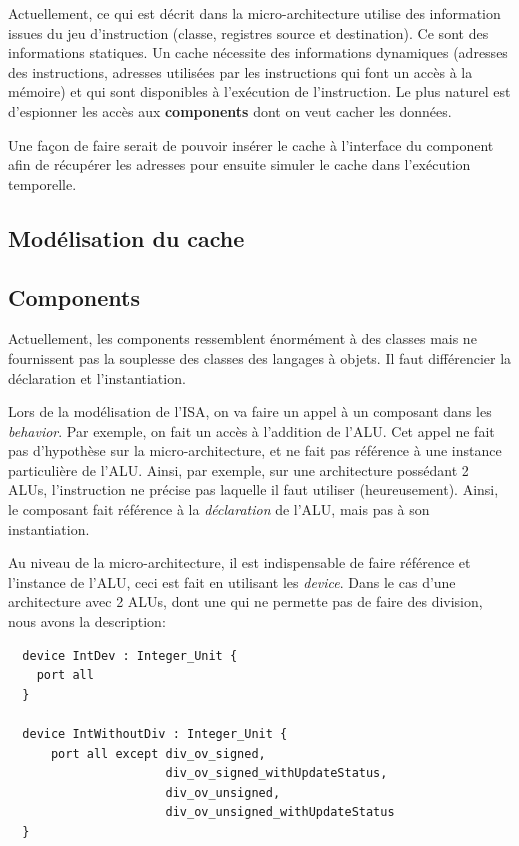 \documentclass[11pt,a4paper]{article}
\begin{document}
Actuellement, ce qui est décrit dans la micro-architecture utilise des information issues du jeu d'instruction (classe, registres source et destination). Ce sont des informations statiques. Un cache nécessite des informations dynamiques (adresses des instructions, adresses utilisées par les instructions qui font un accès à la mémoire) et qui sont disponibles à l'exécution de l'instruction. Le plus naturel est d'espionner les accès aux {\bf components} dont on veut cacher les données.

Une façon de faire serait de pouvoir insérer le cache à l'interface du component afin de récupérer les adresses pour ensuite simuler le cache dans l'exécution temporelle.

\subsection{Modélisation du cache}

\subsection{Components}
Actuellement, les components ressemblent énormément à des classes mais ne fournissent pas la souplesse des classes des langages à objets. Il faut différencier la déclaration et l'instantiation.

Lors de la modélisation de l'ISA, on va faire un appel à un composant dans les \emph{behavior}. Par exemple, on fait un accès à l'addition de l'ALU. Cet appel ne fait pas d'hypothèse sur la micro-architecture, et ne fait pas référence à une instance particulière de l'ALU. Ainsi, par exemple, sur une architecture possédant 2 ALUs, l'instruction ne précise pas laquelle il faut utiliser (heureusement).
Ainsi, le composant fait référence à la \emph{déclaration} de l'ALU, mais pas à son instantiation.

Au niveau de la micro-architecture, il est indispensable de faire référence et l'instance de l'ALU, ceci est fait en utilisant les \emph{device}. Dans le cas d'une architecture avec 2 ALUs, dont une qui ne permette pas de faire des division, nous avons la description:
\begin{lstlisting}
  device IntDev : Integer_Unit {
    port all 
  }

  device IntWithoutDiv : Integer_Unit {
      port all except div_ov_signed,
                      div_ov_signed_withUpdateStatus,
                      div_ov_unsigned,
                      div_ov_unsigned_withUpdateStatus
  }
\end{lstlisting}
\end{document}
